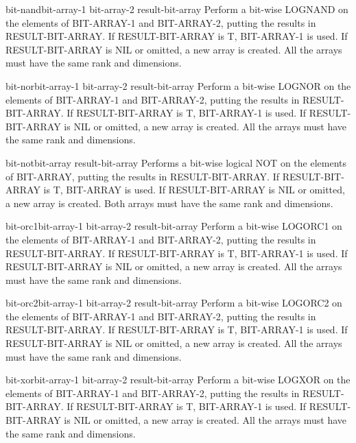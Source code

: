 \documentclass[10pt,english]{book}
\begin{document}
\begin{function}{bit-nand}{bit-array-1 bit-array-2 \op result-bit-array}
  Perform a bit-wise LOGNAND on the elements of BIT-ARRAY-1 and BIT-ARRAY-2,
  putting the results in RESULT-BIT-ARRAY. If RESULT-BIT-ARRAY is T,
  BIT-ARRAY-1 is used. If RESULT-BIT-ARRAY is NIL or omitted, a new array is
  created. All the arrays must have the same rank and dimensions.
\end{function}

\begin{function}{bit-nor}{bit-array-1 bit-array-2 \op result-bit-array}
  Perform a bit-wise LOGNOR on the elements of BIT-ARRAY-1 and BIT-ARRAY-2,
  putting the results in RESULT-BIT-ARRAY. If RESULT-BIT-ARRAY is T,
  BIT-ARRAY-1 is used. If RESULT-BIT-ARRAY is NIL or omitted, a new array is
  created. All the arrays must have the same rank and dimensions.
\end{function}

\begin{function}{bit-not}{bit-array \op result-bit-array}
  Performs a bit-wise logical NOT on the elements of BIT-ARRAY,
  putting the results in RESULT-BIT-ARRAY. If RESULT-BIT-ARRAY is T,
  BIT-ARRAY is used. If RESULT-BIT-ARRAY is NIL or omitted, a new array is
  created. Both arrays must have the same rank and dimensions.
\end{function}

\begin{function}{bit-orc1}{bit-array-1 bit-array-2 \op result-bit-array}
  Perform a bit-wise LOGORC1 on the elements of BIT-ARRAY-1 and BIT-ARRAY-2,
  putting the results in RESULT-BIT-ARRAY. If RESULT-BIT-ARRAY is T,
  BIT-ARRAY-1 is used. If RESULT-BIT-ARRAY is NIL or omitted, a new array is
  created. All the arrays must have the same rank and dimensions.
\end{function}

\begin{function}{bit-orc2}{bit-array-1 bit-array-2 \op result-bit-array}
  Perform a bit-wise LOGORC2 on the elements of BIT-ARRAY-1 and BIT-ARRAY-2,
  putting the results in RESULT-BIT-ARRAY. If RESULT-BIT-ARRAY is T,
  BIT-ARRAY-1 is used. If RESULT-BIT-ARRAY is NIL or omitted, a new array is
  created. All the arrays must have the same rank and dimensions.
\end{function}

\begin{function}{bit-xor}{bit-array-1 bit-array-2 \op result-bit-array}
  Perform a bit-wise LOGXOR on the elements of BIT-ARRAY-1 and BIT-ARRAY-2,
  putting the results in RESULT-BIT-ARRAY. If RESULT-BIT-ARRAY is T,
  BIT-ARRAY-1 is used. If RESULT-BIT-ARRAY is NIL or omitted, a new array is
  created. All the arrays must have the same rank and dimensions.
\end{function}
\end{document}
